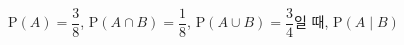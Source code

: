$\mathrm{P}(A)=\dfrac{3}{8}$, $\mathrm{P}(A\cap B)=\dfrac{1}{8}$, $\mathrm{P}(A\cup B)=\dfrac{3}{4}$일 때, $\mathrm{P}(A\mid B)$
